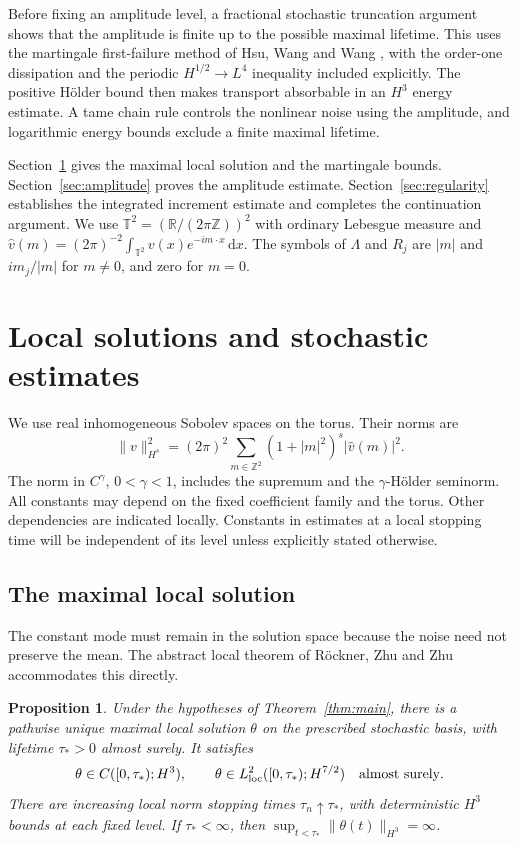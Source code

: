 \documentclass[11pt]{amsart}
\newtheorem{proposition}[theorem]{Proposition}
\theoremstyle{remark}
\numberwithin{equation}{section}
\newcommand{\T}{\mathbb T}
\newcommand{\R}{\mathbb R}
\newcommand{\dd}{\,\mathrm d}
\newcommand{\norm}[1]{\lVert#1\rVert}
\begin{document}
Before fixing an amplitude level, a fractional stochastic truncation argument
shows that the amplitude is finite up to the possible maximal lifetime. This
uses the martingale first-failure method of Hsu, Wang and Wang \cite{HWW},
with the order-one dissipation and the periodic $H^{1/2}\to L^4$ inequality
included explicitly. The positive H\"older bound then makes transport
absorbable in an $H^3$ energy estimate. A tame chain rule controls the nonlinear
noise using the amplitude, and logarithmic energy bounds exclude a finite
maximal lifetime.

Section~\ref{sec:local} gives the maximal local solution and the martingale
bounds. Section~\ref{sec:amplitude} proves the amplitude estimate.
Section~\ref{sec:regularity} establishes the integrated increment estimate
and completes the continuation argument. We use
$\T^2=(\R/(2\pi\mathbb Z))^2$ with ordinary Lebesgue measure and
$\widehat v(m)=(2\pi)^{-2}\int_{\T^2}v(x)e^{-im\cdot x}\dd x$.
The symbols of $\Lambda$ and $R_j$ are $|m|$ and $im_j/|m|$ for $m\ne0$,
and zero for $m=0$.

\section{Local solutions and stochastic estimates}\label{sec:local}

We use real inhomogeneous Sobolev spaces on the torus. Their norms are
\[
 \norm{v}_{H^s}^2=(2\pi)^2\sum_{m\in\mathbb Z^2}
 (1+|m|^2)^s|\widehat v(m)|^2.
\]
The norm in $C^\gamma$, $0<\gamma<1$, includes the supremum and the
$\gamma$-H\"older seminorm. All constants may depend on the fixed coefficient
family and the torus. Other dependencies are indicated locally. Constants in
estimates at a local stopping time will be independent of its level unless
explicitly stated otherwise.

\subsection{The maximal local solution}

The constant mode must remain in the solution space because the noise need not
preserve the mean. The abstract local theorem of R\"ockner, Zhu and Zhu
\cite[Theorem 3.2 and Definition 3.1]{RZZ} accommodates this directly.

\begin{proposition}\label{prop:local}
Under the hypotheses of Theorem~\ref{thm:main}, there is a pathwise unique
maximal local solution $\theta$ on the prescribed stochastic basis, with lifetime
$\tau_*>0$ almost surely. It satisfies
\[
 \theta\in C([0,\tau_*);H^3),\qquad
 \theta\in L^2_{\mathrm{loc}}([0,\tau_*);H^{7/2})
 \quad\hbox{almost surely}.
\]
There are increasing local norm stopping times $\tau_n\uparrow\tau_*$,
with deterministic $H^3$ bounds at each fixed level. If $\tau_*<\infty$,
then $\sup_{t<\tau_*}\norm{\theta(t)}_{H^3}=\infty$.
\end{proposition}
\end{document}
